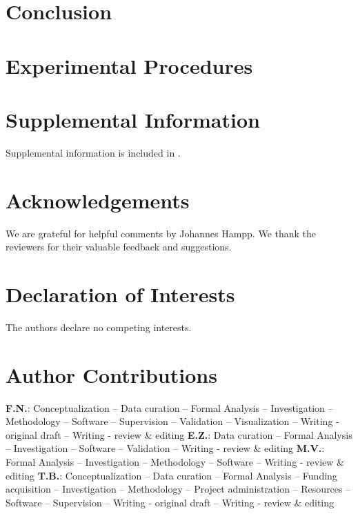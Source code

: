 \documentclass[11pt,preprint]{elsarticle}
\begin{document}


\section*{Conclusion}
\label{sec:conclusion}



\section*{Experimental Procedures}
\label{sec:methods}



\section*{Supplemental Information}

Supplemental information is included in .

\section*{Acknowledgements}

We are grateful for helpful comments by Johannes Hampp. We thank the
reviewers for their valuable feedback and suggestions.

\section*{Declaration of Interests}

The authors declare no competing interests.



\section*{Author Contributions}


\textbf{F.N.}:
Conceptualization --
Data curation --
Formal Analysis --
Investigation --
Methodology --
Software --
Supervision --
Validation --
Visualization --
Writing - original draft --
Writing - review \& editing
\textbf{E.Z.}:
Data curation --
Formal Analysis --
Investigation --
Software --
Validation --
Writing - review \& editing
\textbf{M.V.}:
Formal Analysis --
Investigation --
Methodology --
Software --
Writing - review \& editing
\textbf{T.B.}:
Conceptualization --
Data curation --
Formal Analysis --
Funding acquisition --
Investigation --
Methodology --
Project administration --
Resources --
Software --
Supervision --
Writing - original draft --
Writing - review \& editing
\end{document}
